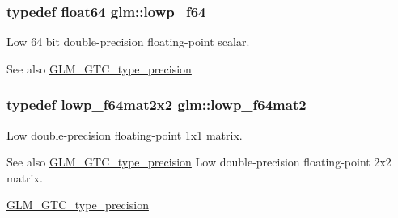 \subsubsection[{\texorpdfstring{lowp\+\_\+f64}{lowp_f64}}]{\setlength{\rightskip}{0pt plus 5cm}typedef float64 {\bf glm\+::lowp\+\_\+f64}}\hypertarget{group__gtc__type__precision_ga59839f4bf6b97c93b0def577890bbfb8}{}\label{group__gtc__type__precision_ga59839f4bf6b97c93b0def577890bbfb8}
Low 64 bit double-\/precision floating-\/point scalar. \begin{DoxySeeAlso}{See also}
\hyperlink{group__gtc__type__precision}{G\+L\+M\+\_\+\+G\+T\+C\+\_\+type\+\_\+precision} 
\end{DoxySeeAlso}
\subsubsection[{\texorpdfstring{lowp\+\_\+f64mat2}{lowp_f64mat2}}]{\setlength{\rightskip}{0pt plus 5cm}typedef lowp\+\_\+f64mat2x2 {\bf glm\+::lowp\+\_\+f64mat2}}\hypertarget{group__gtc__type__precision_ga2984b3b0b6ee0657044d186bb875b4e3}{}\label{group__gtc__type__precision_ga2984b3b0b6ee0657044d186bb875b4e3}
Low double-\/precision floating-\/point 1x1 matrix. \begin{DoxySeeAlso}{See also}
\hyperlink{group__gtc__type__precision}{G\+L\+M\+\_\+\+G\+T\+C\+\_\+type\+\_\+precision} Low double-\/precision floating-\/point 2x2 matrix. 

\hyperlink{group__gtc__type__precision}{G\+L\+M\+\_\+\+G\+T\+C\+\_\+type\+\_\+precision} 
\end{DoxySeeAlso}
